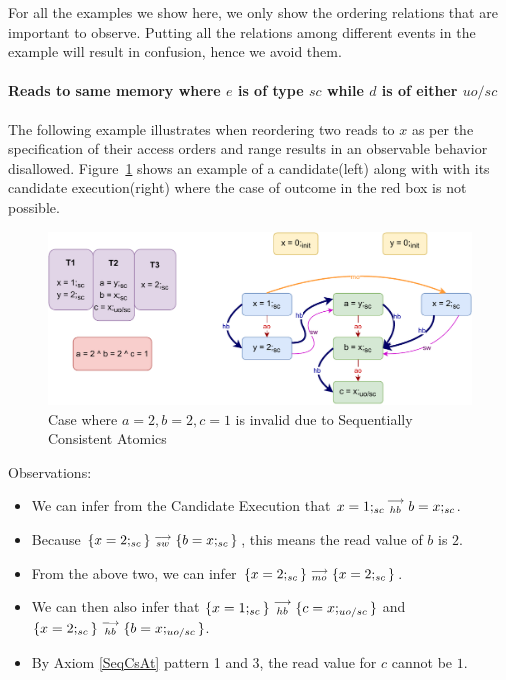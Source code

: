

    For all the examples we show here, we only show the ordering relations that are important to observe. 
    Putting all the relations among different events in the example will result in confusion, hence we avoid them. 

    \paragraph{Reads to same memory where $e$ is of type $sc$ while $d$ is of either $uo/sc$}

        The following example illustrates when reordering two reads to $x$ as per the specification of their access orders and range results in an observable behavior disallowed.
        Figure~\ref{reord_counter:example1(a)} shows an example of a candidate(left) along with with its candidate execution(right) where the case of outcome in the red box is not possible. 
        \begin{figure}[H]
            \centering
            \includegraphics[scale=0.7]{7.CounterExamples/ReorderingCandidate/Example0(Rsc-Ruo,sc).pdf}
            \caption{Case where $a = 2, b = 2, c = 1$ is invalid due to Sequentially Consistent Atomics}
            \label{reord_counter:example1(a)}
        \end{figure}
        
        Observations:
        \begin{itemize}
            \item We can infer from the Candidate Execution that $x=1;_{sc}\stackrel{\longrightarrow}{_{hb}}b=x;_{sc}$.
            \item Because $\{x=2;_{sc}\}\stackrel{\longrightarrow}{_{sw}}\{b=x;_{sc}\}$, this means the read value of $b$ is $2$.
            \item From the above two, we can infer $\{x=2;_{sc}\}\stackrel{\longrightarrow}{_{mo}}\{x=2;_{sc}\}$.
            \item We can then also infer that $\{x=1;_{sc}\}\stackrel{\longrightarrow}{_{hb}}\{c=x;_{uo/sc}\}$ and $\{x=2;_{sc}\}\stackrel{\longrightarrow}{_{hb}}\{b=x;_{uo/sc}\}$.
            \item By Axiom \ref{SeqCsAt} pattern 1 and 3, the read value for $c$ cannot be $1$.
        \end{itemize}

